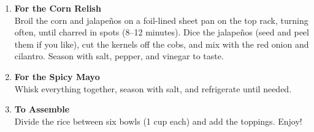 \begin{enumerate}
    \item \textbf{For the Corn Relish} \\
          Broil the corn and jalapeños on a foil-lined sheet pan on the top rack, turning often, until charred in spots (8--12 minutes). Dice the jalapeños (seed and peel them if you like), cut the kernels off the cobs, and mix with the red onion and cilantro. Season with salt, pepper, and vinegar to taste.

    \item \textbf{For the Spicy Mayo} \\
          Whisk everything together, season with salt, and refrigerate until needed.

    \item \textbf{To Assemble} \\
          Divide the rice between six bowls (1 cup each) and add the toppings. Enjoy!

\end{enumerate}


